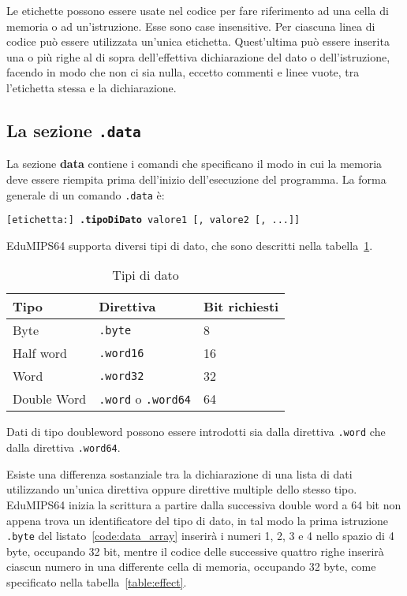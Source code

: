 \documentclass[12pt]{report}
\newcommand{\EM}{EduMIPS64}
\begin{document}
 Le etichette possono essere usate nel codice per fare
riferimento ad una cella di memoria o ad un'istruzione.  Esse sono case
insensitive. Per ciascuna linea di codice pu\`{o} essere utilizzata un'unica
etichetta. Quest'ultima pu\`{o} essere inserita una o pi\`{u} righe al di sopra
dell'effettiva dichiarazione del dato o dell'istruzione, facendo in modo che non
ci sia nulla, eccetto commenti e linee vuote, tra l'etichetta stessa e la
dichiarazione. 

\subsection{La sezione \texttt{.data}}
La sezione \textbf{data} contiene i comandi che specificano il modo in cui la
memoria deve essere riempita prima dell'inizio dell'esecuzione del programma. La
forma generale di un comando \texttt{.data} \`{e}:

\begin{center}
	\texttt{[etichetta:] \textbf{.tipoDiDato} valore1 [, valore2 [, ...]]}
\end{center}

\EM{} supporta diversi tipi di dato, che sono descritti nella tabella~\ref{table:datatypes}.

\begin{table}[!htb]
	\begin{centering}
		\begin{tabular}{lll}
			\hline
			\hline
			Tipo & Direttiva & Bit richiesti\\
			\hline
			Byte & \texttt{.byte} & 8\\
			Half word & \texttt{.word16} & 16\\
			Word & \texttt{.word32} & 32\\
			Double Word & \texttt{.word} o \texttt{.word64} & 64
		\end{tabular}
		\caption{Tipi di dato}
		\label{table:datatypes}
	\end{centering}
\end{table}

Dati di tipo doubleword possono essere introdotti sia dalla direttiva
\texttt{.word} che dalla direttiva \texttt{.word64}.

 Esiste una differenza sostanziale tra la dichiarazione di una lista di dati 
utilizzando un'unica direttiva oppure direttive multiple dello stesso tipo.
\EM{} inizia la scrittura a partire dalla successiva double word a 64 bit non appena 
trova un identificatore del tipo di dato, in tal modo la prima istruzione \texttt{.byte} 
del listato~\ref{code:data_array} inserir\`{a} i numeri 1, 2, 3 e 4 nello spazio di 4 byte, 
occupando 32 bit, mentre il codice delle successive quattro righe inserir\`{a} ciascun numero 
in una differente cella di memoria, occupando 32 byte, come specificato nella tabella~\ref{table:effect}.
\end{document}

